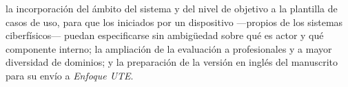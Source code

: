     la incorporación del ámbito del sistema y del nivel de objetivo a la plantilla de casos de uso, para que los iniciados por un dispositivo ---propios de los sistemas ciberfísicos--- puedan especificarse sin ambigüedad sobre qué es actor y qué componente interno; la ampliación de la evaluación a profesionales y a mayor diversidad de dominios; y la preparación de la versión en inglés del manuscrito para su envío a \emph{Enfoque UTE}.
